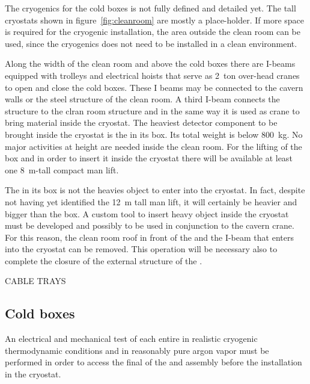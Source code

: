 The cryogenics for the cold boxes is not fully defined and detailed yet.
The tall cryostats shown in figure~\ref{fig:cleanroom} are mostly a place-holder.
If more space is required for the cryogenic installation, the area outside the clean room can be used, since the cryogenics does not need to be installed in a clean environment.

Along the width of the clean room and above the cold boxes there are I-beams equipped with trolleys and electrical hoists that serve as 2~ton over-head cranes to open and close the cold boxes.
These I beams may be connected to the cavern walls or the steel structure of the clean room.
A third I-beam connects the  structure to the clran room structure and in the same way it is used as crane to bring material inside the cryostat.
The heaviest detector component to be brought inside the cryostat is the  in its box.
Its total weight is below 800~kg.
No major activities at height are needed inside the clean room.
For the lifting of the  box and in order to insert it inside the cryostat there will be available at least one 8~m-tall compact man lift.

The  in its box is not the heavies object to enter into the cryostat.
In fact, despite not having yet identified the 12~m tall man lift, it will certainly be heavier and bigger than the  box.
A custom tool to insert heavy object inside the cryostat must be developed and possibly to be used in conjunction to the cavern crane.
For this reason, the clean room roof in front of the  and the I-beam that enters into the cryostat can be removed.
This operation will be necessary also to complete the closure of the external structure of the .

CABLE TRAYS

\subsection{Cold boxes}
An electrical and mechanical test of each entire  in realistic cryogenic thermodynamic conditions and in reasonably pure argon vapor must be performed in order to access the final  of the  and  assembly before the installation in the cryostat.

